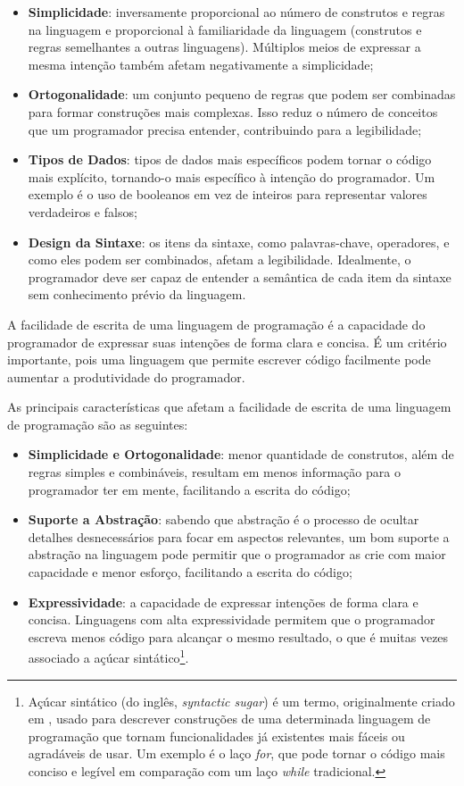 \begin{itemize}
	\item \textbf{Simplicidade}: inversamente proporcional ao número de construtos e regras na linguagem e proporcional à familiaridade da linguagem (construtos e regras semelhantes a outras linguagens). Múltiplos meios de expressar a mesma intenção também afetam negativamente a simplicidade;
	\item \textbf{Ortogonalidade}: um conjunto pequeno de regras que podem ser combinadas para formar construções mais complexas. Isso reduz o número de conceitos que um programador precisa entender, contribuindo para a legibilidade;
	\item \textbf{Tipos de Dados}: tipos de dados mais específicos podem tornar o código mais explícito, tornando-o mais específico à intenção do programador. Um exemplo é o uso de booleanos em vez de inteiros para representar valores verdadeiros e falsos;
	\item \textbf{Design da Sintaxe}: os itens da sintaxe, como palavras-chave, operadores, e como eles podem ser combinados, afetam a legibilidade. Idealmente, o programador deve ser capaz de entender a semântica de cada item da sintaxe sem conhecimento prévio da linguagem.
\end{itemize}


A facilidade de escrita de uma linguagem de programação é a capacidade do programador de expressar suas intenções de forma clara e concisa. É um critério importante, pois uma linguagem que permite escrever código facilmente pode aumentar a produtividade do programador.

As principais características que afetam a facilidade de escrita de uma linguagem de programação são as seguintes:

\begin{itemize}
	\item \textbf{Simplicidade e Ortogonalidade}: menor quantidade de construtos, além de regras simples e combináveis, resultam em menos informação para o programador ter em mente, facilitando a escrita do código;
	\item \textbf{Suporte a Abstração}: sabendo que abstração é o processo de ocultar detalhes desnecessários para focar em aspectos relevantes, um bom suporte a abstração na linguagem pode permitir que o programador as crie com maior capacidade e menor esforço, facilitando a escrita do código;
	\item \textbf{Expressividade}: a capacidade de expressar intenções de forma clara e concisa. Linguagens com alta expressividade permitem que o programador escreva menos código para alcançar o mesmo resultado, o que é muitas vezes associado a açúcar sintático\footnote{Açúcar sintático (do inglês, \textit{syntactic sugar}) é um termo, originalmente criado em , usado para descrever construções de uma determinada linguagem de programação que tornam funcionalidades já existentes mais fáceis ou agradáveis de usar. Um exemplo é o laço \textit{for}, que pode tornar o código mais conciso e legível em comparação com um laço \textit{while} tradicional.}.
\end{itemize}

